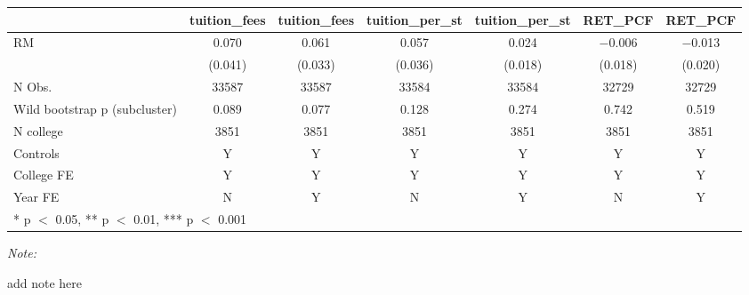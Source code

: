 \begin{table}
\centering
\begin{threeparttable}
\begin{tabular}[t]{lcccccc}
\toprule
  & tuition\_fees & tuition\_fees  & tuition\_per\_st & tuition\_per\_st  & RET\_PCF & RET\_PCF \\
\midrule
RM & \num{0.070} & \num{0.061} & \num{0.057} & \num{0.024} & \num{-0.006} & \num{-0.013}\\
 & (\num{0.041}) & (\num{0.033}) & (\num{0.036}) & (\num{0.018}) & (\num{0.018}) & (\num{0.020})\\
\midrule
N Obs. & \num{33587} & \num{33587} & \num{33584} & \num{33584} & \num{32729} & \num{32729}\\
Wild bootstrap p (subcluster) & 0.089 & 0.077 & 0.128 & 0.274 & 0.742 & 0.519\\
N college & 3851 & 3851 & 3851 & 3851 & 3851 & 3851\\
Controls & Y & Y & Y & Y & Y & Y\\
College FE & Y & Y & Y & Y & Y & Y\\
Year FE & N & Y & N & Y & N & Y\\
\bottomrule
\multicolumn{7}{l}{\rule{0pt}{1em}* p $<$ 0.05, ** p $<$ 0.01, *** p $<$ 0.001}\\
\end{tabular}
\begin{tablenotes}
\item \textit{Note: } 
\item add note here
\end{tablenotes}
\end{threeparttable}
\end{table}
